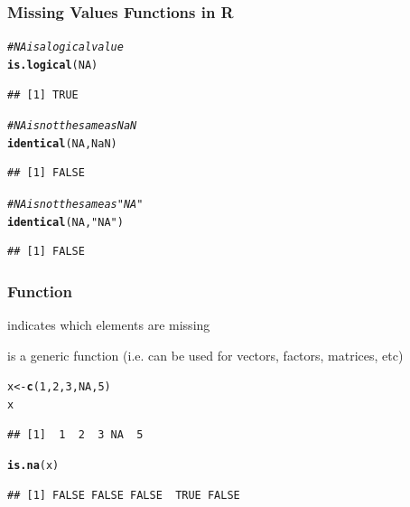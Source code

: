 \documentclass[12pt]{beamer}\usepackage[]{graphicx}\usepackage[]{color}
\makeatletter
\newcommand{\hlnum}[1]{\textcolor[rgb]{0.686,0.059,0.569}{#1}}%
\newcommand{\hlstr}[1]{\textcolor[rgb]{0.192,0.494,0.8}{#1}}%
\newcommand{\hlcom}[1]{\textcolor[rgb]{0.678,0.584,0.686}{\textit{#1}}}%
\newcommand{\hlstd}[1]{\textcolor[rgb]{0.345,0.345,0.345}{#1}}%
\newcommand{\hlkwb}[1]{\textcolor[rgb]{0.69,0.353,0.396}{#1}}%
\newcommand{\hlkwd}[1]{\textcolor[rgb]{0.737,0.353,0.396}{\textbf{#1}}}%
\newenvironment{kframe}{%
 \def\at@end@of@kframe{}%
 \ifinner\ifhmode%
  \def\at@end@of@kframe{\end{minipage}}%
  \begin{minipage}{\columnwidth}%
 \fi\fi%
 \def\FrameCommand##1{\hskip\@totalleftmargin \hskip-\fboxsep
 \colorbox{shadecolor}{##1}\hskip-\fboxsep
     \hskip-\linewidth \hskip-\@totalleftmargin \hskip\columnwidth}%
 \MakeFramed {\advance\hsize-\width
   \@totalleftmargin\z@ \linewidth\hsize
   \@setminipage}}%
 {\par\unskip\endMakeFramed%
 \at@end@of@kframe}
\newenvironment{knitrout}{}{} %
\makeatother
\begin{document}

\begin{frame}[fragile]
\frametitle{Missing Values Functions in R}

\begin{knitrout}\footnotesize
{}\color{fgcolor}\begin{kframe}
\begin{alltt}
\hlcom{# NA is a logical value}
\hlkwd{is.logical}\hlstd{(}\hlnum{NA}\hlstd{)}
\end{alltt}
\begin{verbatim}
## [1] TRUE
\end{verbatim}
\begin{alltt}
\hlcom{# NA is not the same as NaN}
\hlkwd{identical}\hlstd{(}\hlnum{NA}\hlstd{,} \hlnum{NaN}\hlstd{)}
\end{alltt}
\begin{verbatim}
## [1] FALSE
\end{verbatim}
\begin{alltt}
\hlcom{# NA is not the same as "NA"}
\hlkwd{identical}\hlstd{(}\hlnum{NA}\hlstd{,} \hlstr{"NA"}\hlstd{)}
\end{alltt}
\begin{verbatim}
## [1] FALSE
\end{verbatim}
\end{kframe}
\end{knitrout}

\end{frame}


\begin{frame}[fragile]
\frametitle{Function }

\bi
  \item {\hilit {}} indicates which elements are missing
  \item {} is a generic function (i.e. can be used for vectors, factors, matrices, etc)
\ei

\begin{knitrout}\footnotesize
{}\color{fgcolor}\begin{kframe}
\begin{alltt}
\hlstd{x} \hlkwb{<-} \hlkwd{c}\hlstd{(}\hlnum{1}\hlstd{,} \hlnum{2}\hlstd{,} \hlnum{3}\hlstd{,} \hlnum{NA}\hlstd{,} \hlnum{5}\hlstd{)}
\hlstd{x}
\end{alltt}
\begin{verbatim}
## [1]  1  2  3 NA  5
\end{verbatim}
\begin{alltt}
\hlkwd{is.na}\hlstd{(x)}
\end{alltt}
\begin{verbatim}
## [1] FALSE FALSE FALSE  TRUE FALSE
\end{verbatim}
\end{kframe}
\end{knitrout}

\end{frame}
\end{document}
